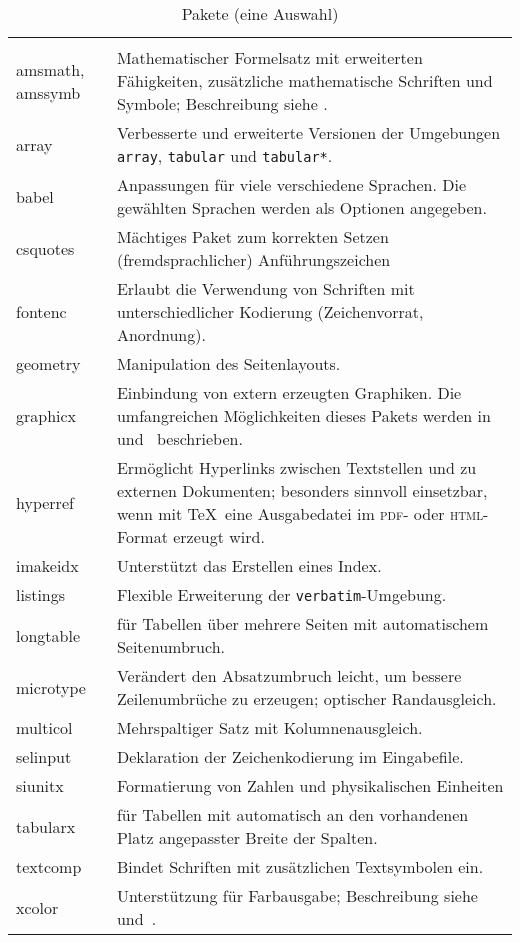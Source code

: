\begin{longtable}[c]{@{}>{\raggedright\arraybackslash\ttfamily}p{2.2cm}%
                         p{}@{}}
 \caption{Pakete (eine Auswahl)}\label{pack} \\\toprule
\endfirsthead
 \caption[]{Pakete (eine Auswahl)}\\\toprule
\endhead
 \multicolumn{2}{r}{\small Fortsetzung nächste Seite}\\
\endfoot
\endlastfoot
 amsmath, amssymb & 
 Mathematischer Formelsatz mit erweiterten Fähigkeiten, zusätzliche 
 mathematische Schriften und Symbole; Beschreibung siehe \cite{ch8}. 
\\
 array & 
 Verbesserte und erweiterte Versionen der Umgebungen  \texttt{array}, 
 \texttt{tabular} und \texttt{tabular*}.
\\
 babel & 
 Anpassungen für viele verschiedene Sprachen. Die  gewählten Sprachen werden 
 als Optionen angegeben.
\\
csquotes  & Mächtiges Paket zum korrekten Setzen (fremdsprachlicher) Anführungszeichen \\
 fontenc & 
 Erlaubt die Verwendung von Schriften mit  unterschiedlicher Kodierung
 (Zeichenvorrat, Anordnung).
\\
 geometry & 
 Manipulation des Seitenlayouts.\\ 
 graphicx & 
 Einbindung von extern erzeugten Graphiken. Die umfangreichen Möglichkeiten 
 dieses Pakets werden in~\cite{grfguide} und~\cite{grfcomp} beschrieben. 
\\
 hyperref & 
 Ermöglicht Hyperlinks zwischen Textstellen und zu externen Dokumenten; 
 besonders sinnvoll einsetzbar, wenn mit \TeX\ eine Ausgabedatei im 
 \textsc{pdf}- oder \textsc{html}-Format erzeugt wird.
\\
 imakeidx & 
 Unterstützt das Erstellen eines Index.
\\
 listings & Flexible Erweiterung der \texttt{verbatim}-Umgebung.
\\
 longtable &
 für Tabellen über mehrere Seiten mit automatischem Seitenumbruch.
\\
microtype & Verändert den Absatzumbruch leicht, um bessere Zeilenumbrüche zu erzeugen; optischer Randausgleich. \\
 multicol & 
 Mehrspaltiger Satz mit Kolumnenausgleich.
\\
 selinput & 
 Deklaration der Zeichenkodierung im Eingabefile.
\\
siunitx   & Formatierung von Zahlen und physikalischen Einheiten  \\
 tabularx & 
 für Tabellen mit automatisch an den vorhandenen Platz angepasster Breite der 
 Spalten.
\\
 textcomp & 
 Bindet Schriften mit zusätzlichen Textsymbolen ein.
 \\
 xcolor & 
 Unterstützung für Farbausgabe;  Beschreibung  siehe~\cite{grfguide} 
 und~\cite{grfcomp}.
\\
\bottomrule
\end{longtable}


